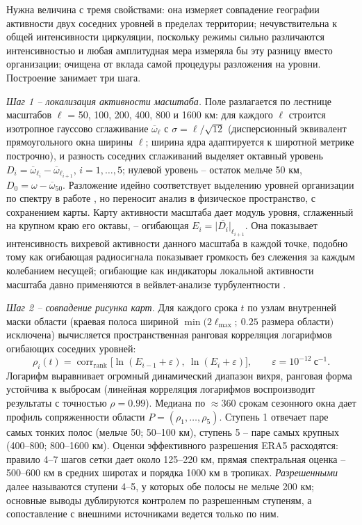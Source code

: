 \documentclass[12pt,a4paper]{article}
\begin{document}
Нужна величина с тремя свойствами: она измеряет совпадение географии активности двух соседних уровней в пределах территории; нечувствительна к общей интенсивности циркуляции, поскольку режимы сильно различаются интенсивностью и любая амплитудная мера измеряла бы эту разницу вместо организации; очищена от вклада самой процедуры разложения на уровни. Построение занимает три шага.

\emph{Шаг 1 -- локализация активности масштаба.} Поле разлагается по лестнице масштабов $\ell$ = 50, 100, 200, 400, 800 и 1600 км: для каждого $\ell$ строится изотропное гауссово сглаживание $\overline{\omega}_\ell$ с $\sigma = \ell/\sqrt{12}$ (дисперсионный эквивалент прямоугольного окна ширины $\ell$; ширина ядра адаптируется к широтной метрике построчно), и разность соседних сглаживаний выделяет октавный уровень $D_i = \overline{\omega}_{\ell_i} - \overline{\omega}_{\ell_{i+1}}$, $i = 1, \dots, 5$; нулевой уровень -- остаток мельче 50 км, $D_0 = \omega - \overline{\omega}_{50}$. Разложение идейно соответствует выделению уровней организации по спектру в работе \cite{Krenke2019}, но переносит анализ в физическое пространство, с сохранением карты. Карту активности масштаба дает модуль уровня, сглаженный на крупном краю его октавы, -- огибающая $E_i = \overline{|D_i|}_{\ell_{i+1}}$. Она показывает интенсивность вихревой активности данного масштаба в каждой точке, подобно тому как огибающая радиосигнала показывает громкость без слежения за каждым колебанием несущей; огибающие как индикаторы локальной активности масштаба давно применяются в вейвлет-анализе турбулентности \cite{Farge1992}.

\emph{Шаг 2 -- совпадение рисунка карт.} Для каждого срока $t$ по узлам внутренней маски области (краевая полоса шириной $\min(2\ell_{\max};\ 0.25$ размера области$)$ исключена) вычисляется пространственная ранговая корреляция логарифмов огибающих соседних уровней:
\begin{equation}
\label{eq:rho}
\rho_i(t) = \operatorname{corr}_{\mathrm{rank}}\bigl[\ln(E_{i-1} + \varepsilon),\ \ln(E_i + \varepsilon)\bigr], \qquad \varepsilon = 10^{-12}\ \text{с}^{-1}.
\end{equation}
Логарифм выравнивает огромный динамический диапазон вихря, ранговая форма устойчива к выбросам (линейная корреляция логарифмов воспроизводит результаты с точностью $\rho = 0.99$). Медиана по $\approx$360 срокам сезонного окна дает профиль сопряженности области $P = (\rho_1, \dots, \rho_5)$. Ступень 1 отвечает паре самых тонких полос (мельче 50; 50--100 км), ступень 5 -- паре самых крупных (400--800; 800--1600 км). Оценки эффективного разрешения ERA5 расходятся: правило 4--7 шагов сетки \cite{Skamarock2004} дает около 125--220 км, прямая спектральная оценка \cite{Bolgiani2022} -- 500--600 км в средних широтах и порядка 1000 км в тропиках. \emph{Разрешенными} далее называются ступени 4--5, у которых обе полосы не мельче 200 км; основные выводы дублируются контролем по разрешенным ступеням, а сопоставление с внешними источниками ведется только по ним.
\end{document}
